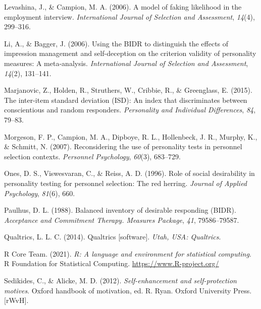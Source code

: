 \documentclass[
  ,man]{apa6}
\newlength{\cslhangindent}
\newlength{\cslentryspacingunit} %
\newenvironment{CSLReferences}[2] %
 {%
  \setlength{\parindent}{0pt}
  \ifodd #1
  \let\oldpar\par
  \def\par{\hangindent=\cslhangindent\oldpar}
  \fi
  \setlength{\parskip}{#2\cslentryspacingunit}
 }%
 {}
\begin{document}
\begin{CSLReferences}{1}{0}
\leavevmode{}%
Levashina, J., \& Campion, M. A. (2006). A model of faking likelihood in the employment interview. \emph{International Journal of Selection and Assessment}, \emph{14}(4), 299--316.

\leavevmode{}%
Li, A., \& Bagger, J. (2006). Using the {BIDR} to distinguish the effects of impression management and self-deception on the criterion validity of personality measures: A meta-analysis. \emph{International Journal of Selection and Assessment}, \emph{14}(2), 131--141.

\leavevmode{}%
Marjanovic, Z., Holden, R., Struthers, W., Cribbie, R., \& Greenglass, E. (2015). The inter-item standard deviation ({ISD}): An index that discriminates between conscientious and random responders. \emph{Personality and Individual Differences}, \emph{84}, 79--83.

\leavevmode{}%
Morgeson, F. P., Campion, M. A., Dipboye, R. L., Hollenbeck, J. R., Murphy, K., \& Schmitt, N. (2007). Reconsidering the use of personality tests in personnel selection contexts. \emph{Personnel Psychology}, \emph{60}(3), 683--729.

\leavevmode{}%
Ones, D. S., Viswesvaran, C., \& Reiss, A. D. (1996). Role of social desirability in personality testing for personnel selection: The red herring. \emph{Journal of Applied Psychology}, \emph{81}(6), 660.

\leavevmode{}%
Paulhus, D. L. (1988). Balanced inventory of desirable responding ({BIDR}). \emph{Acceptance and Commitment Therapy. Measures Package}, \emph{41}, 79586--79587.

\leavevmode{}%
Qualtrics, L. L. C. (2014). Qualtrics {[}software{]}. \emph{Utah, {USA}: Qualtrics}.

\leavevmode{}%
R Core Team. (2021). \emph{R: A language and environment for statistical computing}. R Foundation for Statistical Computing. \url{https://www.R-project.org/}

\leavevmode{}%
Sedikides, C., \& Alicke, M. D. (2012). \emph{Self-enhancement and self-protection motives}. Oxford handbook of motivation, ed. R. Ryan. Oxford University Press.{[}{rWvH}{]}.


\end{CSLReferences}
\end{document}
